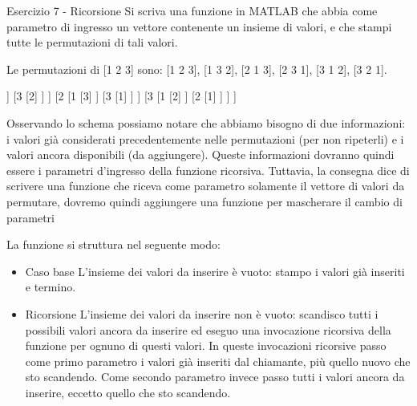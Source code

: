 \documentclass[handout]{beamer}
\begin{document}
\begin{frame}[allowframebreaks]{Esercizio 7 - Ricorsione}
	Si scriva una funzione in MATLAB che abbia come parametro di ingresso un vettore contenente un insieme di valori, e che stampi tutte le permutazioni di
	tali valori.
	
	Le permutazioni di [1 2 3] sono:
	[1 2 3], [1 3 2], [2 1 3], [2 3 1], [3 1 2], [3 2 1].
	
	\begin{center}
	\begin{forest}
	[123
		[1
			[2
				[3]
			]
			[3
				[2]
			]
		]		
		[2
			[1
				[3]
			]
			[3
				[1]
			]
		]
		[3
			[1
				[2]
			]
			[2
				[1]
			]
		]	
	]
	\end{forest}
\end{center}

\framebreak
Osservando lo schema possiamo notare che abbiamo bisogno di due
informazioni: i valori già considerati precedentemente nelle permutazioni (per non ripeterli) e i valori ancora disponibili (da aggiungere). Queste informazioni dovranno quindi essere i parametri d'ingresso della funzione ricorsiva. Tuttavia, la consegna dice di scrivere una funzione che riceva come parametro solamente il vettore di valori da permutare, \alert{dovremo quindi aggiungere una funzione per mascherare il cambio di parametri}

\framebreak
La funzione si struttura nel seguente modo:
\begin{itemize}
	\item \alert{Caso base} L'insieme dei valori da inserire è vuoto: stampo i valori già inseriti e termino.
	\item \alert{Ricorsione} L'insieme dei valori da inserire non è vuoto: scandisco tutti i possibili valori
	ancora da inserire ed eseguo una invocazione ricorsiva della funzione per
	ognuno di questi valori. In queste invocazioni ricorsive passo come primo
	parametro i valori già inseriti dal chiamante, più quello nuovo che sto
	scandendo. Come secondo parametro invece passo tutti i valori ancora da
	inserire, eccetto quello che sto scandendo.
\end{itemize}
\end{frame}
\end{document}
